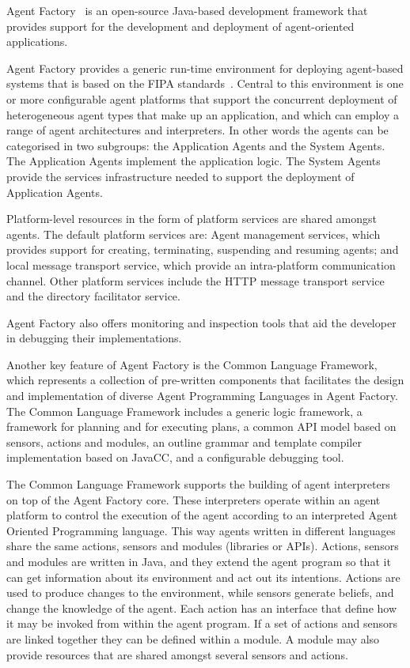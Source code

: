 \documentclass[a4paper,12pt,oneside,fleqn]{book} %
\theoremstyle{plain}
\theoremstyle{definition}
\theoremstyle{remark}
\begin{document}
Agent Factory~\cite{collier2002agent} is an open-source Java-based
development framework that provides support for the development and
deployment of agent-oriented applications.

Agent Factory provides a generic run-time environment for deploying
agent-based systems that is based on the FIPA
standards~\cite{poslad2000fipa}.  Central to this environment is one or
more configurable agent platforms that support the concurrent deployment of
heterogeneous agent types that make up an application, and which can employ
a range of agent architectures and interpreters. In other words the agents
can be categorised in two subgroups: the Application Agents and the System
Agents. The Application Agents implement the application logic. The System
Agents provide the services infrastructure needed to support the deployment
of Application Agents. 

Platform-level resources in the form of platform services are shared
amongst agents. The default platform services are: Agent management
services, which provides support for creating, terminating, suspending and
resuming agents; and local message transport service, which provide an
intra-platform communication channel. Other platform services include the
HTTP message transport service and the directory facilitator service.

Agent Factory also offers monitoring and inspection tools that aid the
developer in debugging their implementations.

Another key feature of Agent Factory is the Common Language Framework,
which represents a collection of pre-written components that facilitates
the design and implementation of diverse Agent Programming Languages in
Agent Factory\null. The Common Language Framework includes a generic logic
framework, a framework for planning and for executing plans, a common API
model based on sensors, actions and modules, an outline grammar and
template compiler implementation based on JavaCC, and a configurable
debugging tool.

The Common Language Framework supports the building of agent interpreters
on top of the Agent Factory core. These interpreters operate within an
agent platform to control the execution of the agent according to an
interpreted Agent Oriented Programming language. This way agents written in
different languages share the same actions, sensors and modules (libraries
or APIs). Actions, sensors and modules are written in Java, and they extend
the agent program so that it can get information about its environment and
act out its intentions. Actions are used to produce changes to the
environment, while sensors generate beliefs, and change the knowledge of
the agent. Each action has an interface that define how it may be invoked
from within the agent program. If a set of actions and sensors are linked
together they can be defined within a module. A module may also provide
resources that are shared amongst several sensors and actions. 
\end{document}
